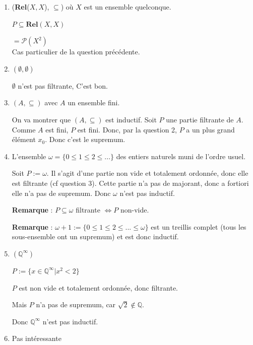 \documentclass[12pt]{article}
\begin{document}
\begin{enumerate}
\begin{enumerate}
        Ce qu'on a démontrer dans les notes du cours. 

        $(\forall i \in I, P_i \subseteq Q) \iff \bigcup_{i \in I}{P_i} \subseteq Q $

    \item (\textbf{Rel}($X,X$), $\subseteq$) où $X$ est un ensemble quelconque. 

        $P \subseteq \textbf{Rel}(X,X) $

            $= \mathcal{P}(X^2)$\\ 
            Cas particulier de la question précédente.
    \item $(\emptyset, \emptyset) $

        $\emptyset$ n'est pas filtrante, C'est bon.

    \item $(A, \subseteq)$ avec $A$ un ensemble fini. 

        On va montrer que $(A, \subseteq)$ est inductif. Soit $P$ une partie filtrante de $A$. Comme $A$ est fini, $P$ est fini. Donc, par la question 2, $P$ a un plus grand élément $x_0$. Donc c'est le supremum.

    \item L'ensemble $\omega = \{0 \leq 1 \leq 2 \leq ...\}$ des entiers naturels muni de l'ordre usuel. 

        Soit $P := \omega$. Il s'agit d'une partie non vide et totalement ordonnée, donc elle est filtrante (cf question 3). Cette partie n'a pas de majorant, donc a fortiori elle n'a pas de supremum. Donc $\omega$ n'est pas inductif. 

        \textbf{Remarque} : $P \subseteq \omega$ filtrante $\iff P$ non-vide. 

        \textbf{Remarque} : $\omega + 1 := \{ 0 \leq 1 \leq 2 \leq ... \leq \omega\}$ est un treillis complet (tous les sous-ensemble ont un supremum) et est donc inductif.
        
        

\item $(\mathbb{Q}^\infty)$

    $P := \{ x \in \mathbb{Q}^\infty | x^2 < 2 \} $

    $P$ est non vide et totalement ordonnée, donc filtrante.

    Mais $P$ n'a pas de supremum, car $\sqrt{2} \notin \mathbb{Q}$. 

    Donc $\mathbb{Q}^\infty$ n'est pas inductif.

\item Pas intéressante


\end{enumerate}
\end{enumerate}
\end{document}
